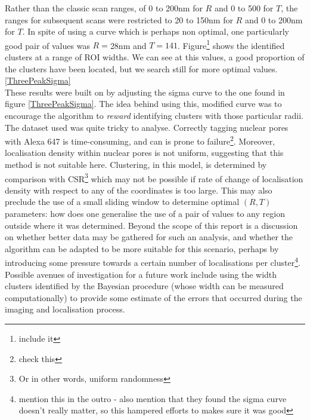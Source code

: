 \documentclass[11pt]{article}
\begin{document}
Rather than the classic scan ranges, of 0 to 200nm for $R$ and 0 to 500 for $T$, the ranges for subsequent scans were restricted to 20 to 150nm for $R$ and 0 to 200nm for $T$. In spite of using a curve which is perhaps non optimal, one particularly good pair of values was $R=$28nm and $T=141$. Figure\footnote{include it} shows the identified clusters at a range of ROI widths. We can see at this values, a good proportion of the clusters have been located, but we search still for more optimal values. \ref{ThreePeakSigma}\\

These results were built on by adjusting the sigma curve to the one found in figure \ref{ThreePeakSigma}. The idea behind using this, modified curve was to encourage the algorithm to \textit{reward} identifying clusters with those particular radii.\\

The dataset used was quite tricky to analyse. Correctly tagging nuclear pores with Alexa 647 is time-consuming, and can is prone to failure\footnote{check this}. Moreover, localisation density within nuclear pores is not uniform, suggesting that this method is not suitable here. Clustering, in this model, is determined by comparison with CSR\footnote{Or in other words, uniform randomness} which may not be possible if rate of change of localisation density with respect to any of the coordinates is too large. This may also preclude the use of a small sliding window to determine optimal $(R,T)$ parameters: how does one generalise the use of a pair of values to any region outside where it was determined.
Beyond the scope of this report is a discussion on whether better data may be gathered for such an analysis, and whether the algorithm can be adapted to be more suitable for this scenario, perhaps by introducing some pressure towards a certain number of localisations per cluster\footnote{mention this in the outro - also mention that they found the sigma curve doesn't really matter, so this hampered efforts to makes sure it was good}. Possible avenues of investigation for a future work include using the width clusters identified by the Bayesian procedure (whose width can be measured computationally) to provide some estimate of the errors that occurred during the imaging and localisation process.  \\

	
%	
\end{document}
